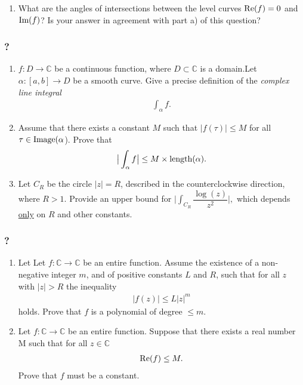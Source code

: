\begin{enumerate}
\def\labelenumi{(\roman{enumi})}
\setcounter{enumi}{1}
\tightlist
\item
  What are the angles of intersections between the level curves
  \(\mbox{\textrm Re}{(f)}=0\) and \(\mbox{\textrm Im}{(f)}\)? Is your
  answer in agreement with part a) of this question?
\end{enumerate}

\hypertarget{section-188}{%
\subsubsection{?}\label{section-188}}

\begin{enumerate}
\def\labelenumi{(\alph{enumi})}
\item
  \(f: D\rightarrow {\mathbb C}\) be a continuous function, where
  \(D\subset {\mathbb C}\) is a domain.Let \(\alpha:[a,b]\rightarrow D\)
  be a smooth curve. Give a precise definition of the \emph{complex line
  integral}
  \begin{align*}\int_{\alpha} f.\end{align*}
\item
  Assume that there exists a constant \(M\) such that
  \(|f(\tau)|\leq M\) for all \(\tau\in \mbox{\textrm Image}(\alpha\)).
  Prove that
  \begin{align*}\big | \int_{\alpha} f \big |\leq M \times \mbox{\textrm length}(\alpha).\end{align*}
\item
  Let \(C_R\) be the circle \(|z|=R\), described in the counterclockwise
  direction, where \(R>1\). Provide an upper bound for
  \(\big | \int_{C_R} \dfrac{\log{(z)} }{z^2} \big |,\) which depends
  \underline{only} on \(R\) and other constants.
\end{enumerate}

\hypertarget{section-189}{%
\subsubsection{?}\label{section-189}}

\begin{enumerate}
\def\labelenumi{(\alph{enumi})}
\item
  Let Let \(f:{\mathbb C}\rightarrow {\mathbb C}\) be an entire
  function. Assume the existence of a non-negative integer \(m\), and of
  positive constants \(L\) and \(R\), such that for all \(z\) with
  \(|z|>R\) the inequality
  \begin{align*}|f(z)| \leq L |z|^m\end{align*}
  holds. Prove that \(f\) is a polynomial of degree \(\leq m\).
\item
  Let \(f:{\mathbb C}\rightarrow {\mathbb C}\) be an entire function.
  Suppose that there exists a real number M such that for all
  \(z\in {\mathbb C}\)
  \begin{align*}\mbox{\textrm Re} (f) \leq M.\end{align*}
  Prove that \(f\) must be a constant.
\end{enumerate}

